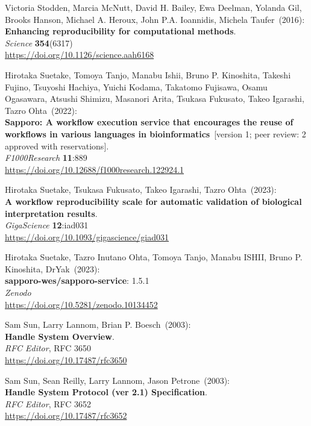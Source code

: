 \begin{thebibliography}{9}
Victoria Stodden, Marcia McNutt, David H. Bailey, Ewa Deelman, Yolanda Gil, Brooks Hanson, Michael A. Heroux, John P.A. Ioannidis, Michela Taufer~(2016): \\
\textbf{Enhancing reproducibility for computational methods}.\\
\emph{Science} \textbf{354}(6317) \\
\url{https://doi.org/10.1126/science.aah6168}

Hirotaka Suetake, Tomoya Tanjo, Manabu Ishii, Bruno P. Kinoshita, Takeshi Fujino, Tsuyoshi Hachiya, Yuichi Kodama, Takatomo Fujisawa, Osamu Ogasawara, Atsushi Shimizu, Masanori Arita, Tsukasa Fukusato, Takeo Igarashi, Tazro Ohta~(2022): \\
\textbf{Sapporo: A workflow execution service that encourages the reuse of workflows in various languages in bioinformatics}~[version 1; peer review: 2 approved with reservations].\\
\emph{F1000Research} \textbf{11}:889\\
\url{https://doi.org/10.12688/f1000research.122924.1}

Hirotaka Suetake, Tsukasa Fukusato, Takeo Igarashi, Tazro Ohta~(2023): \\
\textbf{A workflow reproducibility scale for automatic validation of biological interpretation results}.\\
\emph{GigaScience} \textbf{12}:iad031\\
\url{https://doi.org/10.1093/gigascience/giad031}

Hirotaka Suetake, Tazro Inutano Ohta, Tomoya Tanjo, Manabu ISHII, Bruno P. Kinoshita, DrYak~(2023): \\
\textbf{sapporo-wes/sapporo-service}: 1.5.1\\
\emph{Zenodo}\\
\url{https://doi.org/10.5281/zenodo.10134452}

Sam Sun, Larry Lannom, Brian P. Boesch~(2003): \\
\textbf{Handle System Overview}.\\
\emph{RFC Editor}, RFC 3650\\
\url{https://doi.org/10.17487/rfc3650}

Sam Sun, Sean Reilly, Larry Lannom, Jason Petrone~(2003): \\
\textbf{Handle System Protocol (ver 2.1) Specification}.\\
\emph{RFC Editor}, RFC 3652\\
\url{https://doi.org/10.17487/rfc3652}


\end{thebibliography}

